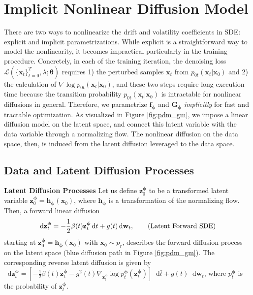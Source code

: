 \documentclass{article}
\makeatletter
\theoremstyle{definition}
\theoremstyle{remark}
\newcommand*\diff{\mathop{}\!\mathrm{d}}
\newcommand{\leqnomode}{\tagsleft@true}\newcommand{\reqnomode}{\tagsleft@false}
\makeatother
\begin{document}
	\leqnomode
	
	\section{Implicit Nonlinear Diffusion Model}\label{sec:methodology}
	
	There are two ways to nonlinearize the drift and volatility coefficients in SDE: explicit and implicit parametrizations. While explicit is a straightforward way to model the nonlinearity, it becomes impractical particularly in the training procedure. Concretely, in each of the training iteration, the denoising loss $\mathcal{L}(\{\mathbf{x}_{t}\}_{t=0}^{T},\lambda;\bm{\theta})$ requires 1) the perturbed samples $\mathbf{x}_{t}$ from $p_{0t}(\mathbf{x}_{t}\vert\mathbf{x}_{0})$ and 2) the calculation of $\nabla\log{p_{0t}(\mathbf{x}_{t}\vert\mathbf{x}_{0})}$, and these two steps require long execution time because the transition probability $p_{0t}(\mathbf{x}_{t}\vert\mathbf{x}_{0})$ is intractable for nonlinear diffusions in general. Therefore, we parametrize $\mathbf{f}_{\bm{\phi}}$ and $\mathbf{G}_{\bm{\phi}}$ \textit{implicitly} for fast and tractable optimization. As visualized in Figure \ref{fig:pdm_gm}, we impose a linear diffusion model on the latent space, and connect this latent variable with the data variable through a normalizing flow. The nonlinear diffusion on the data space, then, is induced from the latent diffusion leveraged to the data space.
	
	\subsection{Data and Latent Diffusion Processes}
	
	\textbf{Latent Diffusion Processes} Let us define $\mathbf{z}_{0}^{\bm{\phi}}$ to be a transformed latent variable $\mathbf{z}_{0}^{\bm{\phi}}=\mathbf{h}_{\bm{\phi}}(\mathbf{x}_{0})$, where $\mathbf{h}_{\bm{\phi}}$ is a transformation of the normalizing flow. Then, a forward linear diffusion
	\begin{align*}
	\diff\mathbf{z}_{t}^{\bm{\phi}}=-\frac{1}{2}\beta(t)\mathbf{z}_{t}^{\bm{\phi}}\diff t+g(t)\diff \mathbf{w}_{t},\tag{\text{Latent Forward SDE}}
	\end{align*}
	starting at $\mathbf{z}_{0}^{\bm{\phi}}=\mathbf{h}_{\bm{\phi}}(\mathbf{x}_{0})$ with $\mathbf{x}_{0}\sim p_{r}$, describes the forward diffusion process on the latent space (blue diffusion path in Figure \ref{fig:pdm_gm}). The corresponding reverse latent diffusion is given by $\diff\mathbf{z}_{t}^{\bm{\phi}}=[-\frac{1}{2}\beta(t)\mathbf{z}_{t}^{\bm{\phi}}-g^{2}(t)\nabla_{\mathbf{z}_{t}^{\bm{\phi}}}\log{p_{t}^{\bm{\phi}}(\mathbf{z}_{t}^{\bm{\phi}})}]\diff\bar{t}+g(t)\diff\mathbf{\bar{w}}_{t}$, where $p_{t}^{\bm{\phi}}$ is the probability of $\mathbf{z}_{t}^{\bm{\phi}}$.
	
\end{document}

